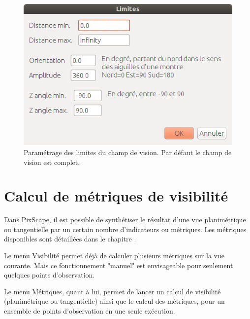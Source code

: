 \documentclass{report}
\begin{document}
\begin{figure}[H]
	\includegraphics[scale=0.5]{img/bounds-fr.png} 
	\caption{Paramétrage des limites du champ de vision. Par défaut le champ de vision est complet.}
	\label{bounds_dlg}
\end{figure}

\section{Calcul de métriques de visibilité}
\label{calc_metrics}
Dans PixScape, il est possible de synthétiser le résultat d'une vue planimétrique ou tangentielle par un certain nombre d'indicateurs ou métriques. Les métriques disponibles sont détaillées dans le chapitre . 

Le menu Visibilité permet déjà de calculer plusieurs métriques sur la vue courante. Mais ce fonctionnement "manuel" est envisageable pour seulement quelques points d'observation. 

Le menu Métriques, quant à lui, permet de lancer un calcul de visibilité (planimétrique ou tangentielle) ainsi que le calcul des métriques, pour un ensemble de points d'observation en une seule exécution. 
\end{document}
